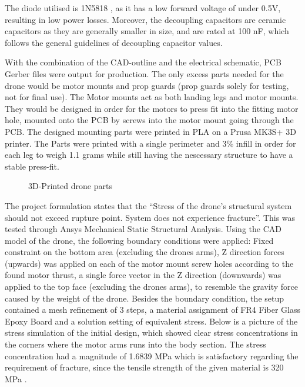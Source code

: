 The diode utilised is 1N5818 \cite{1N5818}, as it has a low 
forward voltage of under 0.5V, resulting in low 
power losses. Moreover, the decoupling capacitors
are ceramic capacitors as they are generally smaller
in size, and are rated at 100 nF, which follows 
the general guidelines of decoupling capacitor values.
\cite{DecouplingCap}

With the combination of the CAD-outline and the electrical schematic, PCB Gerber files were output for production. The only excess parts needed for the drone would be motor mounts and prop guards (prop guards solely for testing, not for final use). The Motor mounts act as both landing legs and motor mounts. They would be designed in order for the motors to press fit into the fitting motor hole, mounted onto the PCB by screws into the motor mount going through the PCB. The designed mounting parts were printed in PLA on a Prusa MK3S+ 3D printer. The Parts were printed with a single perimeter and 3\% infill in order for each leg to weigh 1.1 grams while still having the nescessary structure to have a stable press-fit. 

\begin{figure}[H]%
    \centering
    \qquad
    \qquad
    \caption{3D-Printed drone parts}%
    \label{fig:example}%
\end{figure}

The project formulation states that the “Stress of the drone’s structural system should not exceed rupture point. System does not experience fracture”. This was tested through Ansys Mechanical Static Structural Analysis. Using the CAD model of the drone, the following boundary conditions were applied: Fixed constraint on the bottom area (excluding the drones arms), Z direction forces (upwards) was applied on each of the motor mount screw holes according to the found motor thrust, a single force vector in the Z direction (downwards) was applied to the top face (excluding the drones arms), to resemble the gravity force caused by the weight of the drone. Besides the boundary condition, the setup contained a mesh refinement of 3 steps, a material assignment of FR4 Fiber Glass Epoxy Board and a solution setting of equivalent stress. Below is a picture of the stress simulation of the initial design, which showed clear stress concentrations in the corners where the motor arms runs into the body section. The stress concentration had a magnitude of 1.6839 MPa which is satisfactory regarding the requirement of fracture, since the tensile strength of the given material is 320 MPa \cite{FR4}. 

